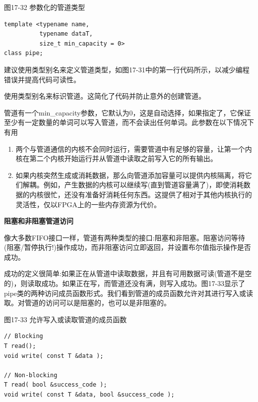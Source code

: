 \hspace*{\fill} \par %
图17-32 参数化的管道类型
\begin{lstlisting}[caption={}]
template <typename name,
		  typename dataT,
		  size_t min_capacity = 0>
class pipe;
\end{lstlisting}

建议使用类型别名来定义管道类型，如图17-31中的第一行代码所示，以减少编程错误并提高代码可读性。\par

\begin{tcolorbox}[colback=red!5!white,colframe=red!75!black]
使用类型别名来标识管道。这简化了代码并防止意外的创建管道。
\end{tcolorbox}

管道有一个min\_capacity参数，它默认为0，这是自动选择，如果指定了，它保证至少有一定数量的单词可以写入管道，而不会读出任何单词。此参数在以下情况下有用\par

\begin{enumerate}
	\item 两个与管道通信的内核不会同时运行，需要管道中有足够的容量，让第一个内核在第二个内核开始运行并从管道中读取之前写入它的所有输出。
	\item 如果内核突然生成或消耗数据，那么向管道添加容量可以提供内核隔离，将它们解耦。例如，产生数据的内核可以继续写(直到管道容量满了)，即使消耗数据的内核很忙，还没有准备好消耗任何东西。这提供了相对于其他内核执行的灵活性，仅以FPGA上的一些内存资源为代价。
\end{enumerate}

\hspace*{\fill} \par %
\textbf{阻塞和非阻塞管道访问}

像大多数FIFO接口一样，管道有两种类型的接口:阻塞和非阻塞。阻塞访问等待(阻塞/暂停执行!)操作成功，而非阻塞访问立即返回，并设置布尔值指示操作是否成功。\par

成功的定义很简单:如果正在从管道中读取数据，并且有可用数据可读(管道不是空的)，则读取成功。如果正在写，而管道还没有满，则写入成功。图17-33显示了pipe类的两种访问成员函数形式。我们看到管道的成员函数允许对其进行写入或读取。对管道的访问可以是阻塞的，也可以是非阻塞的。\par

\hspace*{\fill} \par %
图17-33 允许写入或读取管道的成员函数
\begin{lstlisting}[caption={}]
// Blocking
T read();
void write( const T &data );

// Non-blocking
T read( bool &success_code );
void write( const T &data, bool &success_code ); 
\end{lstlisting}


